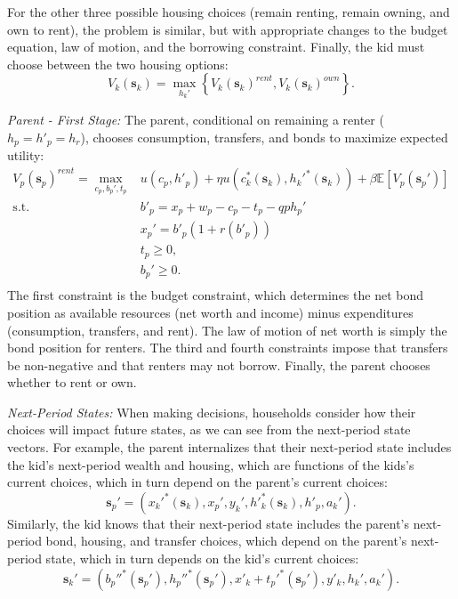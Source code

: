 \documentclass[12pt]{article}
\newcommand{\E}{\mathbb{E}}
\begin{document}
For the other three possible housing choices (remain renting, remain owning, and own to rent), the problem is similar, but with appropriate changes to the budget equation, law of motion, and the borrowing constraint. Finally, the kid must choose between the two housing options:
\begin{equation}
	V_k(\mathbf{s}_k) = \max_{h_k'} \left\{V_k(\mathbf{s}_k)^{rent},V_k(\mathbf{s}_k)^{own}\right\}.
\end{equation}

\textit{Parent - First Stage:} The parent, conditional on remaining a renter ($h_p=h'_p=h_r$), chooses consumption, transfers, and bonds to maximize expected utility:
\begin{equation}\label{eq:Vp}
\begin{split}
V_p(\mathbf{s}_p)^{rent} = \max_{c_p,b_p',t_p} & u(c_p,h'_p) + {\eta} u\left (c_k^*({\mathbf{s}_k}),h_k'^*({\mathbf{s}_k})\right ) + \beta \E \left[V_{p}({\mathbf{s}_p'})\right] \\
\text{s.t.}\quad & b'_p = x_p + w_p - c_p - t_p - q p h_p'\\
& x_p' = b'_p(1+r(b'_p)) \\
& t_p\ge0, \\
& b_p'\ge 0. \\
\end{split}
\end{equation}
The first constraint is the budget constraint, which determines the net bond position as available resources (net worth and income) minus expenditures (consumption, transfers, and rent). The law of motion of net worth is simply the bond position for renters. The third and fourth constraints impose that transfers be non-negative and that renters may not borrow. Finally, the parent chooses whether to rent or own.

\textit{Next-Period States:}
When making decisions, households consider how their choices will impact future states, as we can see from the next-period state vectors. For example, the parent internalizes that their next-period state includes the kid's next-period wealth and housing, which are functions of the kids's current choices, which in turn depend on the parent's current choices:
\begin{equation}
	\mathbf{s}_p' = \left(x_k'^{*}({\mathbf{s}_k}),x_p',y_k',h'^*_k({\mathbf{s}_k}),h'_p,a_k'\right).
\end{equation}
Similarly, the kid knows that their next-period state includes the parent's next-period bond, housing, and transfer choices, which depend on the parent's next-period state, which in turn depends on the kid's current choices:
\begin{equation}
	\mathbf{s}_k' = (b_p''^*({\mathbf{s}_p'}),h_p''^*({\mathbf{s}_p'}),x'_k + t_p'^*({\mathbf{s}_p'}),y'_k,h_k',a_k').
\end{equation}
	
\end{document}
